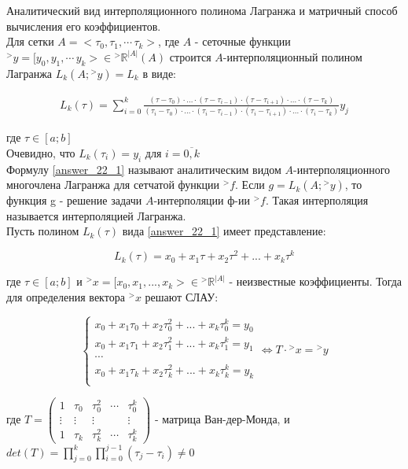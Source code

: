 \documentclass[__main__.tex]{subfiles}
\begin{document}
Аналитический вид интерполяционного полинома Лагранжа и матричный способ вычисления его коэффициентов.\\

Для сетки $A = <\tau_0, \tau_1, \cdots\, \tau_k>$, где $A$ - сеточные функции ${}^{>}y = [y_0, y_1, \cdots\, y_k> \in {}^{>}\mathbb{R}^{|A|}(A)$ строится $A$-интерполяционный полином Лагранжа $L_k(A; {}^{>}y) = L_k$ в виде:

\begin{gather}
L_k(\tau) = \sum_{i = 0}^{k}\frac{(\tau - \tau_0)\cdot \text{...} \cdot(\tau - \tau_{i -1})\cdot(\tau - \tau_{i + 1})\cdot \text{...} \cdot (\tau - \tau_k)}{(\tau_i - \tau_0)\cdot \text{...} \cdot(\tau_i - \tau_{i -1})\cdot(\tau_i - \tau_{i + 1})\cdot \text{...} \cdot (\tau_i - \tau_k)}y_j
\label{answer_22_1}
\end{gather}

где $\tau \in [a; b]$\\

Очевидно, что $L_k(\tau_i) = y_i$ для $i = \overline{0, k}$\\

Формулу \ref{answer_22_1} называют аналитическим видом $A$-интерполяционного многочлена Лагранжа для сетчатой функции ${}^{>}f$. Если $g = L_k(A; {}^{>}y)$, то функция g - решение задачи $A$-интерполяции ф-ии ${}^{>}f$. Такая интерполяция называется интерполяцией Лагранжа.\\

Пусть полином $L_k(\tau)$ вида \ref{answer_22_1} имеет представление:

$$L_k(\tau) = x_0 + x_1 \tau + x_2 \tau^2 + \text{...} + x_k \tau^k$$

где $\tau \in [a; b]$ и ${}^{>}x = [x_0, x_1, \text{...}, x_k> \in {}^{>}\mathbb{R}^{|A|}$ - неизвестные коэффициенты. Тогда для определения вектора ${}^{>}x$ решают СЛАУ:

$$
\begin{cases}
x_0 + x_1 \tau_0 + x_2 \tau_0^2 + \text{...} + x_k \tau_0^k = y_0 \\
x_0 + x_1 \tau_1 + x_2 \tau_1^2 + \text{...} + x_k \tau_1^k = y_1 \\
\cdots\\
x_0 + x_1 \tau_k + x_2 \tau_k^2 + \text{...} + x_k \tau_k^k = y_k \\
\end{cases}
\Leftrightarrow T \cdot {}^{>}x = {}^{>}y$$

где $T = \begin{pmatrix} 1 & \tau_0 & \tau_0^2 & \cdots & \tau_0^k \\ \vdots & \vdots & \vdots & & \vdots \\ 1 & \tau_k & \tau_k^2 & \cdots & \tau_k^k \end{pmatrix}$ - матрица Ван-дер-Монда, и $det(T) = \prod_{j = 0}^{k}\prod_{i = 0}^{j - 1}(\tau_j - \tau_i) \neq 0$
\end{document}
